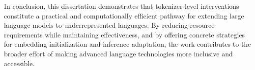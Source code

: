 

In conclusion, this dissertation demonstrates that tokenizer-level interventions constitute a practical and computationally efficient pathway for extending large language models to underrepresented languages. By reducing resource requirements while maintaining effectiveness, and by offering concrete strategies for embedding initialization and inference adaptation, the work contributes to the broader effort of making advanced language technologies more inclusive and accessible.
